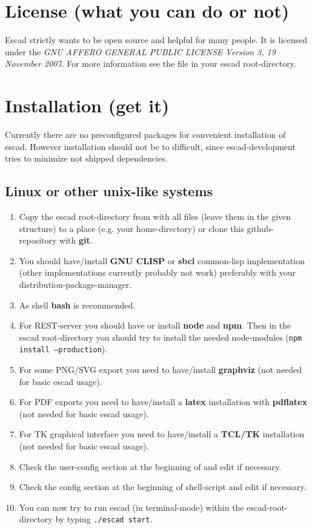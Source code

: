 \documentclass[a4paper, 12pt, openany]{scrbook}
\begin{document}
\section{License (what you can do or not)}
Escad strictly wants to be open source and helpful for many people. It is licensed under the \emph{GNU AFFERO GENERAL PUBLIC LICENSE Version 3, 19 November 2007}. For more information see the file  in your escad root-directory.
\section{Installation (get it)}
Currently there are no preconfigured packages for convenient installation of escad. However installation should not be to difficult, since escad-development tries to minimize not shipped dependencies.
\subsection{Linux or other unix-like systems}
\begin{enumerate}
\item Copy the escad root-directory from  with all files (leave them in the given structure) to a place (e.g. your home-directory) or clone this github-repository with \textbf{git}.
\item You should have/install \textbf{GNU CLISP} or \textbf{sbcl} common-lisp implementation (other implementations currently probably not work) preferably with your distribution-package-manager.
\item As shell \textbf{bash} is recommended.
\item For REST-server you should have or install \textbf{node} and \textbf{npm}. Then in the escad root-directory you should try to install the needed node-modules (\texttt{npm install --production}).
\item For some PNG/SVG export you need to have/install \textbf{graphviz} (not needed for basic escad usage).
\item For PDF exports you need to have/install a \textbf{latex} installation with \textbf{pdflatex} (not needed for basic escad usage).
\item For TK graphical interface you need to have/install a \textbf{TCL/TK} installation (not needed for basic escad usage).
\item Check the user-config section at the beginning of  and edit if necessary.
\item Check the config section at the beginning of shell-script  and edit if necessary.
\item You can now try to run escad (in terminal-mode) within the escad-root-directory by typing \texttt{./escad start}.
\end{enumerate}
\end{document}
